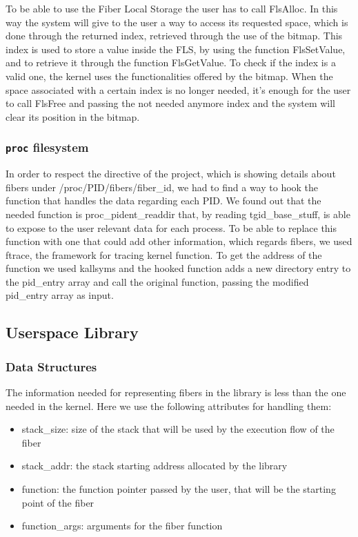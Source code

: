\documentclass[a4paper,10pt]{article}
\begin{document}
To be able to use the Fiber Local Storage the user has to call FlsAlloc. In this way the system will give to the user a way to access its requested space, which is done through the returned index, retrieved through the use of the bitmap. This index is used to store a value inside the FLS, by using the function FlsSetValue, and to retrieve it through the function FlsGetValue. To check if the index is a valid one, the kernel uses the functionalities offered by the bitmap. When the space associated with a certain index is no longer needed, it’s enough for the user to call FlsFree and passing the not needed anymore index and the system will clear its position in the bitmap.

\subsubsection{\texttt{\/proc} filesystem}
In order to respect the directive of the project, which is showing details about fibers under /proc/PID/fibers/fiber\_id, we had to find a way to hook the function that handles the data regarding each PID. We found out that the needed function is proc\_pident\_readdir that, by reading tgid\_base\_stuff, is able to expose to the user relevant data for each process. To be able to replace this function with one that could add other information, which regards fibers, we used ftrace, the framework for tracing kernel function. To get the address of the function we used kallsyms and the hooked function adds a new directory entry to the pid\_entry array and call the original function, passing the modified pid\_entry array as input.

\subsection{Userspace Library}

\subsubsection{Data Structures}
The information needed for representing fibers in the library is less than the one needed in the kernel. Here we use the following attributes for handling them:
\begin{itemize}
  \item stack\_size: size of the stack that will be used by the execution flow of the fiber
\item stack\_addr: the stack starting address allocated by the library
\item function: the function pointer passed by the user, that will be the starting point of the fiber
\item function\_args: arguments for the fiber function
\end{itemize}
\end{document}
